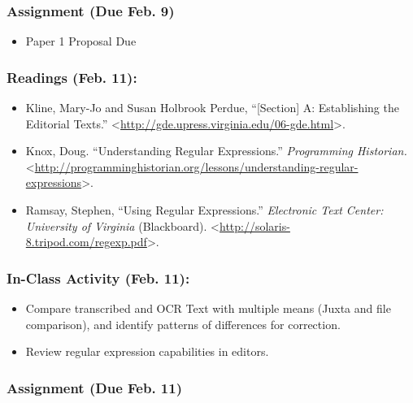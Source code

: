 \documentclass[]{article}
\begin{document}
\subsubsection{Assignment (Due Feb. 9)}\label{assignment-due-feb.-9}

\begin{itemize}
\itemsep1pt\parskip0pt
\item
  Paper 1 Proposal Due
\end{itemize}

\subsubsection{Readings (Feb. 11):}\label{readings-feb.-11}

\begin{itemize}
\itemsep1pt\parskip0pt
\item
  Kline, Mary-Jo and Susan Holbrook Perdue, ``{[}Section{]} A:
  Establishing the Editorial Texts.''
  \textless{}\url{http://gde.upress.virginia.edu/06-gde.html}\textgreater{}.
\item
  Knox, Doug. ``Understanding Regular Expressions.'' \emph{Programming
  Historian.}
  \textless{}\url{http://programminghistorian.org/lessons/understanding-regular-expressions}\textgreater{}.
\item
  Ramsay, Stephen, ``Using Regular Expressions.'' \emph{Electronic Text
  Center: University of Virginia} (Blackboard).
  \textless{}\url{http://solaris-8.tripod.com/regexp.pdf}\textgreater{}.
\end{itemize}

\subsubsection{In-Class Activity (Feb.
11):}\label{in-class-activity-feb.-11}

\begin{itemize}
\itemsep1pt\parskip0pt
\item
  Compare transcribed and OCR Text with multiple means (Juxta and file
  comparison), and identify patterns of differences for correction.
\item
  Review regular expression capabilities in editors.
\end{itemize}

\subsubsection{Assignment (Due Feb. 11)}\label{assignment-due-feb.-11}
\end{document}
